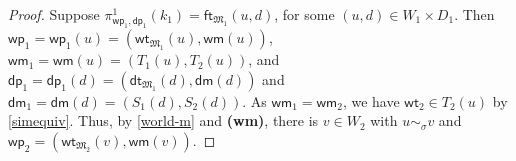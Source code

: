 \documentclass[10pt,a4paper]{amsart}
\theoremstyle{plain}
\theoremstyle{definition}
\newcommand{\wt}{\mathsf{wt}}
\newcommand{\dt}{\mathsf{dt}}
\newcommand{\ft}{\mathsf{ft}}
\newcommand{\wm}{\mathsf{wm}}
\newcommand{\dm}{\mathsf{dm}}
\newcommand{\owp}{\mathsf{wp}_1}
\newcommand{\twp}{\mathsf{wp}_2}
\newcommand{\odp}{\mathsf{dp}_1}
\begin{document}
\begin{proof}
	
	Suppose $\pi^1_{\owp,\odp}(k_1) = \ft_{\mathfrak{M}_{1}}(u,d)$, for some $(u,d)\in W_{1} \times D_{1}$. Then $\owp = \owp(u) = (\wt_{\mathfrak M_1}(u), \wm(u) )$, $\wm_1 = \wm(u) = (T_1(u), T_2(u))$, and $\odp = \odp(d) = (\dt_{\mathfrak M_1}(d), \dm(d) )$ and $\dm_1 = \dm(d) = (S_1(d), S_2(d))$. 
	As $\wm_1 = \wm_2$, we have $\wt_2 \in T_2(u)$ by \eqref{simequiv}. Thus, by \eqref{world-m} and  {\bf (wm)},
	there is $v \in W_2$ with $u \sim_\sigma v$ and $\twp = (\wt_{\mathfrak M_2}(v), \wm(v) )$.
	
	
	

\end{proof}
\end{document}
